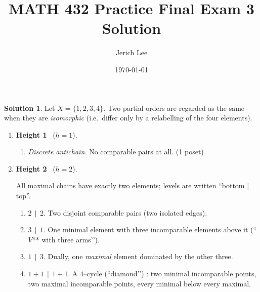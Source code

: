 \documentclass[12pt]{article}
\title{MATH 432 Practice Final Exam 3 Solution}
\author{Jerich Lee}
\date{\today}
\theoremstyle{definition} %
\newtheorem{solution}{Solution}
\theoremstyle{plain} %
\begin{document}
\maketitle

\bigskip
\begin{solution}
  Let \(X=\{1,2,3,4\}\).  
Two partial orders are regarded as the same when they are
\emph{isomorphic} (i.e.\ differ only by a relabelling of the four
elements).

\begin{enumerate}[label=\textbf{\arabic*.},leftmargin=2.3em]

\item \textbf{Height 1} \ (\(h=1\)).  

      \begin{enumerate}[label*=\arabic*.]
      \item \emph{Discrete antichain.}  
            No comparable pairs at all.  (1 poset)
      \end{enumerate}

\item \textbf{Height 2} \ (\(h=2\)).  

      All maximal chains have exactly two elements;  
      levels are written “bottom \(\mid\) top”.

      \begin{enumerate}[label*=\arabic*.]
      \item \(2\,\mid\,2\).  
            Two disjoint comparable pairs (two isolated edges).  

      \item \(3\,\mid\,1\).  
            One minimal element with three incomparable elements above
            it (“\,\(V\!\!\)** with three arms’’).  

      \item \(1\,\mid\,3\).  
            Dually, one \emph{maximal} element dominated by the other
            three.  

      \item \(1+1\,\mid\,1+1\).  
            A $4$–cycle (“diamond’’) : two minimal incomparable points,
            two maximal incomparable points, every minimal below every
            maximal.  


\end{enumerate}
\end{enumerate}
\end{solution}
\end{document}
